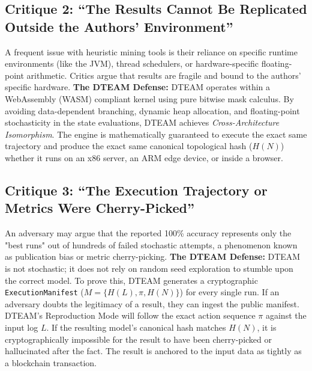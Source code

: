 \subsection{Critique 2: ``The Results Cannot Be Replicated Outside the Authors' Environment''}
A frequent issue with heuristic mining tools is their reliance on specific runtime environments (like the JVM), thread schedulers, or hardware-specific floating-point arithmetic. Critics argue that results are fragile and bound to the authors' specific hardware.
\newline
\textbf{The DTEAM Defense:} DTEAM operates within a WebAssembly (WASM) compliant kernel using pure bitwise mask calculus. By avoiding data-dependent branching, dynamic heap allocation, and floating-point stochasticity in the state evaluations, DTEAM achieves \textit{Cross-Architecture Isomorphism}. The engine is mathematically guaranteed to execute the exact same trajectory and produce the exact same canonical topological hash ($H(N)$) whether it runs on an x86 server, an ARM edge device, or inside a browser.

\subsection{Critique 3: ``The Execution Trajectory or Metrics Were Cherry-Picked''}
An adversary may argue that the reported 100\% accuracy represents only the "best runs" out of hundreds of failed stochastic attempts, a phenomenon known as publication bias or metric cherry-picking.
\newline
\textbf{The DTEAM Defense:} DTEAM is not stochastic; it does not rely on random seed exploration to stumble upon the correct model. To prove this, DTEAM generates a cryptographic \texttt{ExecutionManifest} ($M = \{ H(L), \pi, H(N) \}$) for every single run. If an adversary doubts the legitimacy of a result, they can ingest the public manifest. DTEAM's Reproduction Mode will follow the exact action sequence $\pi$ against the input log $L$. If the resulting model's canonical hash matches $H(N)$, it is cryptographically impossible for the result to have been cherry-picked or hallucinated after the fact. The result is anchored to the input data as tightly as a blockchain transaction.

